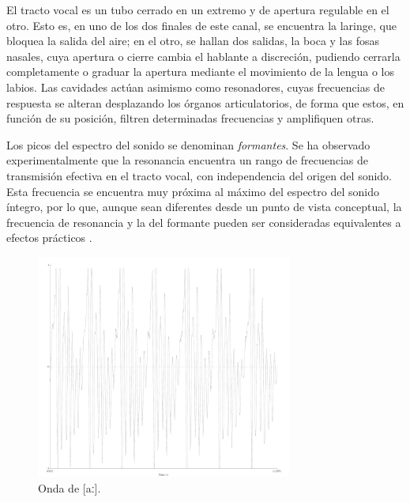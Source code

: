 El tracto vocal es un tubo cerrado en un extremo y de apertura regulable en el otro. Esto es, en uno de los dos finales de este canal, se encuentra la laringe, que bloquea la salida del aire; en el otro, se hallan dos salidas, la boca y las fosas nasales, cuya apertura o cierre cambia el hablante a discreción, pudiendo cerrarla completamente o graduar la apertura mediante el movimiento de la lengua o los labios. Las cavidades actúan asimismo como resonadores, cuyas frecuencias de respuesta se alteran desplazando los órganos articulatorios, de forma que estos, en función de su posición, filtren determinadas frecuencias y amplifiquen otras.

Los picos del espectro del sonido se denominan \textit{formantes}. Se ha observado experimentalmente que la resonancia encuentra un rango de frecuencias de transmisión efectiva en el tracto vocal, con independencia del origen del sonido. Esta frecuencia se encuentra muy próxima al máximo del espectro del sonido íntegro, por lo que, aunque sean diferentes desde un punto de vista conceptual, la frecuencia de resonancia y la del formante pueden ser consideradas equivalentes a efectos prácticos \parencite[20]{fant1970}.

\begin{figure}[!ht]
	\centering
	\includegraphics[width=0.75\textwidth]{images/ondaa}
	\caption{Onda de [aː].}
	\label{fig:ondaa}
\end{figure}

